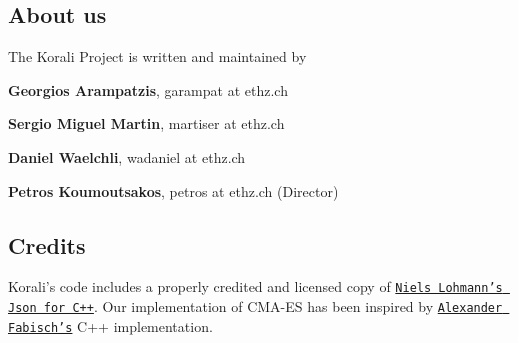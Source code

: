 \subsection*{About us}

The Korali Project is written and maintained by


\begin{DoxyItemize}
\item {\bfseries Georgios Arampatzis}, garampat at ethz.\-ch
\item {\bfseries Sergio Miguel Martin}, martiser at ethz.\-ch
\item {\bfseries Daniel Waelchli}, wadaniel at ethz.\-ch
\item {\bfseries Petros Koumoutsakos}, petros at ethz.\-ch (Director)
\end{DoxyItemize}

\subsection*{Credits}

Korali's code includes a properly credited and licensed copy of \href{https://github.com/nlohmann/json}{\tt Niels Lohmann's Json for C++}. Our implementation of C\-M\-A-\/\-E\-S has been inspired by \href{https://github.com/AlexanderFabisch/CMA-ESpp}{\tt Alexander Fabisch's} C++ implementation. 